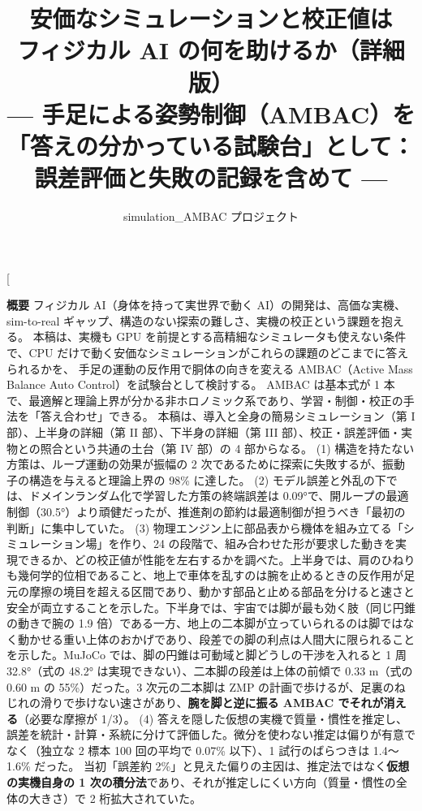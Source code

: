 \documentclass[paper=a4paper,fontsize=10pt,twocolumn,column_gap=2zw,line_length=24zw,number_of_lines=46,head_space=20mm]{jlreq}
\title{\textbf{安価なシミュレーションと校正値は\\フィジカル AI の何を助けるか（詳細版）}\\[0.3em]
\large --- 手足による姿勢制御（AMBAC）を「答えの分かっている試験台」として：\\誤差評価と失敗の記録を含めて ---}
\author{simulation\_AMBAC プロジェクト}
\date{\fpversion}
\begin{document}
\twocolumn[
\begin{@twocolumnfalse}
\maketitle
\vspace{-1.5em}
\begin{center}\begin{minipage}{0.9\textwidth}\small
\textbf{概要}\quad
フィジカル AI（身体を持って実世界で動く AI）の開発は、高価な実機、sim-to-real ギャップ、構造のない探索の難しさ、実機の校正という課題を抱える。
本稿は、実機も GPU を前提とする高精細なシミュレータも使えない条件で、CPU だけで動く安価なシミュレーションがこれらの課題のどこまでに答えられるかを、
手足の運動の反作用で胴体の向きを変える AMBAC（Active Mass Balance Auto Control）を試験台として検討する。
AMBAC は基本式が 1 本で、最適解と理論上界が分かる非ホロノミック系であり、学習・制御・校正の手法を「答え合わせ」できる。
本稿は、導入と全身の簡易シミュレーション（第 I 部）、上半身の詳細（第 II 部）、下半身の詳細（第 III 部）、校正・誤差評価・実物との照合という共通の土台（第 IV 部）の 4 部からなる。
(1) 構造を持たない方策は、ループ運動の効果が振幅の 2 次であるために探索に失敗するが、振動子の構造を与えると理論上界の 98\% に達した。
(2) モデル誤差と外乱の下では、ドメインランダム化で学習した方策の終端誤差は 0.09°で、開ループの最適制御（30.5°）より頑健だったが、推進剤の節約は最適制御が担うべき「最初の判断」に集中していた。
(3) 物理エンジン上に部品表から機体を組み立てる「シミュレーション場」を作り、24 の段階で、組み合わせた形が要求した動きを実現できるか、どの校正値が性能を左右するかを調べた。上半身では、肩のひねりも幾何学的位相であること、地上で車体を乱すのは腕を止めるときの反作用が足元の摩擦の境目を超える区間であり、動かす部品と止める部品を分けると速さと安全が両立することを示した。下半身では、宇宙では脚が最も効く肢（同じ円錐の動きで腕の 1.9 倍）である一方、地上の二本脚が立っていられるのは脚ではなく動かせる重い上体のおかげであり、段差での脚の利点は人間大に限られることを示した。MuJoCo では、脚の円錐は可動域と脚どうしの干渉を入れると 1 周 32.8°（式の 48.2° は実現できない）、二本脚の段差は上体の前傾で 0.33 m（式の 0.60 m の 55\%）だった。3 次元の二本脚は ZMP の計画で歩けるが、足裏のねじれの滑りで歩けない速さがあり、\textbf{腕を脚と逆に振る AMBAC でそれが消える}（必要な摩擦が 1/3）。
(4) 答えを隠した仮想の実機で質量・慣性を推定し、誤差を統計・計算・系統に分けて評価した。微分を使わない推定は偏りが有意でなく（独立な 2 標本 100 回の平均で 0.07\% 以下）、1 試行のばらつきは 1.4〜1.6\% だった。
当初「誤差約 2\%」と見えた偏りの主因は、推定法ではなく\textbf{仮想の実機自身の 1 次の積分法}であり、それが推定しにくい方向（質量・慣性の全体の大きさ）で 2 桁拡大されていた。

\end{minipage}
\end{center}
\end{@twocolumnfalse}
\end{document}
